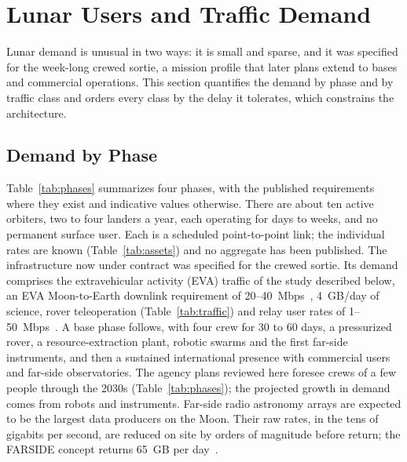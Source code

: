 \documentclass{IEEEoj}
\begin{document}
\section{Lunar Users and Traffic Demand}
\label{sec:demand}
Lunar demand is unusual in two ways: it is small and sparse, and it was specified for the week-long crewed sortie, a mission profile that later plans extend to bases and commercial operations. This section quantifies the demand by phase and by traffic class and orders every class by the delay it tolerates, which constrains the architecture.

\subsection{Demand by Phase}
Table~\ref{tab:phases} summarizes four phases, with the published requirements where they exist and indicative values otherwise. There are about ten active orbiters, two to four landers a year, each operating for days to weeks, and no permanent surface user. Each is a scheduled point-to-point link; the individual rates are known (Table~\ref{tab:assets}) and no aggregate has been published. The infrastructure now under contract was specified for the crewed sortie. Its demand comprises the extravehicular activity (EVA) traffic of the study described below, an EVA Moon-to-Earth downlink requirement of \SI{20}{}--\SI{40}{Mbps}~\cite{nasa_arts_comm}, \SI{4}{GB/day} of science, rover teleoperation (Table~\ref{tab:traffic}) and relay user rates of \SI{1}{}--\SI{50}{Mbps}~\cite{nasa_lunar_relay_srd}. A base phase follows, with four crew for 30 to 60 days, a pressurized rover, a resource-extraction plant, robotic swarms and the first far-side instruments, and then a sustained international presence with commercial users and far-side observatories. The agency plans reviewed here foresee crews of a few people through the 2030s (Table~\ref{tab:phases}); the projected growth in demand comes from robots and instruments. Far-side radio astronomy arrays are expected to be the largest data producers on the Moon. Their raw rates, in the tens of gigabits per second, are reduced on site by orders of magnitude before return; the FARSIDE concept returns \SI{65}{GB} per day~\cite{burns_farside_2019}.
\end{document}
